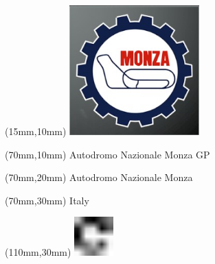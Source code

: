 \begin{textblock*}{50mm}(15mm,10mm)%
\includegraphics[width=50mm]{LG/2015-05-20_00086.png}
\end{textblock*}
\begin{textblock*}{130mm}(70mm,10mm)%
{\fontsize{20}{20}\selectfont Autodromo Nazionale Monza GP}\\
\end{textblock*}
\begin{textblock*}{120mm}(70mm,20mm)%
{\fontsize{16}{16}\selectfont Autodromo Nazionale Monza}\\
\end{textblock*}
\begin{textblock*}{120mm}(70mm,30mm)%
{\fontsize{12}{12}\selectfont Italy}
\end{textblock*}
\begin{textblock*}{30mm}(110mm,30mm)%
\centering
\includegraphics[height=15mm]{icons/fa-rotate-right.pdf}
\end{textblock*}
